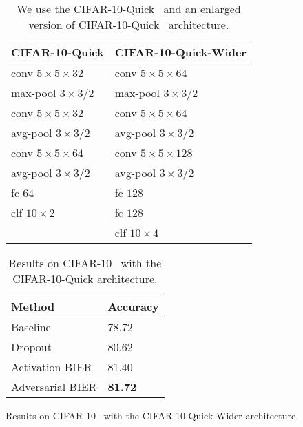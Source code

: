 \documentclass[10pt,journal,compsoc]{IEEEtran}
\begin{document}
\begin{table}[htbp]
    \caption{We use the CIFAR-10-Quick~\cite{jia2014caffe} and an enlarged version of CIFAR-10-Quick~\cite{cogswell2016reducing} architecture.}
    \label{tbl:network-architecture}
    \renewcommand{\arraystretch}{1.3}
    \centering
    \begin{tabular}{|l|l|}
        \hline
        CIFAR-10-Quick           & CIFAR-10-Quick-Wider \\
        \hline
        conv $5\times5\times32$  & conv $5 \times 5 \times 64$ \\
        max-pool $3\times3/2$    & max-pool $3\times3/2$ \\
        \hline
        conv $5\times5\times32$  & conv $5 \times 5 \times 64$ \\
        avg-pool $3\times3/2$    & avg-pool $3\times3/2$ \\
        \hline
        conv $5\times5\times64$  & conv $5 \times 5 \times 128$ \\
        avg-pool $3\times3/2$    & avg-pool $3\times3/2$ \\
        \hline
        fc $64$                  & fc $128$ \\
        \hline
        clf $10\times2$          & fc $128$ \\
        \hline
                                 & clf $10\times4$ \\
        \hline
    \end{tabular}
\end{table}\begin{table}[htbp]
    \caption{Results on CIFAR-10~\cite{krizhevsky2009learning} with the CIFAR-10-Quick architecture.}
    \label{tbl:cifar-10-quick-results}
    \renewcommand{\arraystretch}{1.3}
    \centering
    \begin{tabular}{ll}
        \hline
        Method   & Accuracy \\
        \hline
        Baseline & 78.72  \\
        Dropout  & 80.62  \\
        \hline
        Activation BIER      & 81.40    \\
        Adversarial BIER     & \textbf{81.72}    \\
        \hline
    \end{tabular}
\end{table}\begin{table}[htbp]
    \caption{Results on CIFAR-10~\cite{krizhevsky2009learning} with the CIFAR-10-Quick-Wider architecture.}

\end{table}
\end{document}
